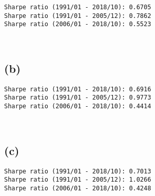 \documentclass[10pt]{article}
\begin{document}
    \begin{Verbatim}[commandchars=\\\{\}]
Sharpe ratio (1991/01 - 2018/10): 0.6705
Sharpe ratio (1991/01 - 2005/12): 0.7862
Sharpe ratio (2006/01 - 2018/10): 0.5523

    \end{Verbatim}

    \begin{center}
    \end{center}
    { \hspace*{\fill} \\}
    
    \subsection{(b)}\label{b}
    \begin{Verbatim}[commandchars=\\\{\}]
Sharpe ratio (1991/01 - 2018/10): 0.6916
Sharpe ratio (1991/01 - 2005/12): 0.9773
Sharpe ratio (2006/01 - 2018/10): 0.4414

    \end{Verbatim}

    \begin{center}
    \end{center}
    { \hspace*{\fill} \\}
    
    \subsection{(c)}\label{c}

    \begin{Verbatim}[commandchars=\\\{\}]
Sharpe ratio (1991/01 - 2018/10): 0.7013
Sharpe ratio (1991/01 - 2005/12): 1.0266
Sharpe ratio (2006/01 - 2018/10): 0.4248

    \end{Verbatim}

    \begin{center}
    \end{center}
    { \hspace*{\fill} \\}
    
\end{document}
